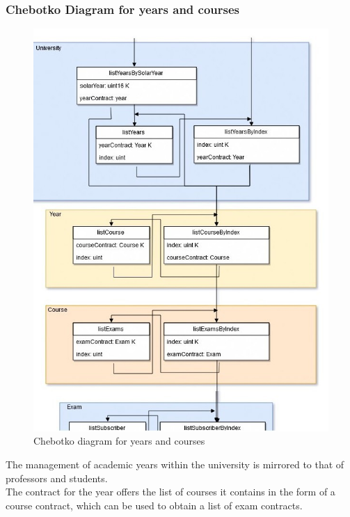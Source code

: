 \documentclass[ManualeSviluppatore]{subfiles}
\begin{document}
\subsubsection{Chebotko Diagram for years and courses}
\begin{figure}[H]
	\centering
	\includegraphics[width=0.9\linewidth]{"diagrammi/chebotko/year_course"}
	\caption{Chebotko diagram for years and courses}
	\label{fig:Chebotko diagram for years and courses}
\end{figure}
The management of academic years within the university is mirrored to that of professors and students. \\
The contract for the year offers the list of courses it contains in the form of a course contract, which can be used to obtain a list of exam contracts. \\
\end{document}
